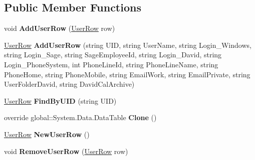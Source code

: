 \subsection*{Public Member Functions}
\begin{DoxyCompactItemize}
\item 
void {\bfseries Add\+User\+Row} (\hyperlink{class_products_1_1_data_1_1ds_sage_1_1_user_row}{User\+Row} row)\hypertarget{class_products_1_1_data_1_1ds_sage_1_1_user_data_table_a5c012af0f9a723d0a08b1cf69a93a73b}{}\label{class_products_1_1_data_1_1ds_sage_1_1_user_data_table_a5c012af0f9a723d0a08b1cf69a93a73b}

\item 
\hyperlink{class_products_1_1_data_1_1ds_sage_1_1_user_row}{User\+Row} {\bfseries Add\+User\+Row} (string U\+ID, string User\+Name, string Login\+\_\+\+Windows, string Login\+\_\+\+Sage, string Sage\+Employee\+Id, string Login\+\_\+\+David, string Login\+\_\+\+Phone\+System, int Phone\+Line\+Id, string Phone\+Line\+Name, string Phone\+Home, string Phone\+Mobile, string Email\+Work, string Email\+Private, string User\+Folder\+David, string David\+Cal\+Archive)\hypertarget{class_products_1_1_data_1_1ds_sage_1_1_user_data_table_a6e8132b75dc7a069d79eba0b659fe591}{}\label{class_products_1_1_data_1_1ds_sage_1_1_user_data_table_a6e8132b75dc7a069d79eba0b659fe591}

\item 
\hyperlink{class_products_1_1_data_1_1ds_sage_1_1_user_row}{User\+Row} {\bfseries Find\+By\+U\+ID} (string U\+ID)\hypertarget{class_products_1_1_data_1_1ds_sage_1_1_user_data_table_ae1bf68aea3930d6876745c9321121044}{}\label{class_products_1_1_data_1_1ds_sage_1_1_user_data_table_ae1bf68aea3930d6876745c9321121044}

\item 
override global\+::\+System.\+Data.\+Data\+Table {\bfseries Clone} ()\hypertarget{class_products_1_1_data_1_1ds_sage_1_1_user_data_table_a86bcaea1399807bde4086ebfde9df447}{}\label{class_products_1_1_data_1_1ds_sage_1_1_user_data_table_a86bcaea1399807bde4086ebfde9df447}

\item 
\hyperlink{class_products_1_1_data_1_1ds_sage_1_1_user_row}{User\+Row} {\bfseries New\+User\+Row} ()\hypertarget{class_products_1_1_data_1_1ds_sage_1_1_user_data_table_a518b2d92c8d7f46ba679611cee69efb9}{}\label{class_products_1_1_data_1_1ds_sage_1_1_user_data_table_a518b2d92c8d7f46ba679611cee69efb9}

\item 
void {\bfseries Remove\+User\+Row} (\hyperlink{class_products_1_1_data_1_1ds_sage_1_1_user_row}{User\+Row} row)\hypertarget{class_products_1_1_data_1_1ds_sage_1_1_user_data_table_a44d11ea70f844645b36c7959afced802}{}\label{class_products_1_1_data_1_1ds_sage_1_1_user_data_table_a44d11ea70f844645b36c7959afced802}

\end{DoxyCompactItemize}
